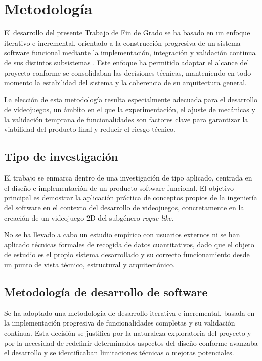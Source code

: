\chapter{Metodología}

El desarrollo del presente Trabajo de Fin de Grado se ha basado en un enfoque iterativo e incremental, orientado a la construcción progresiva de un sistema software funcional mediante la implementación, integración y validación continua de sus distintos subsistemas \cite{REF_METODOLOGIA}. Este enfoque ha permitido adaptar el alcance del proyecto conforme se consolidaban las decisiones técnicas, manteniendo en todo momento la estabilidad del sistema y la coherencia de su arquitectura general.

La elección de esta metodología resulta especialmente adecuada para el desarrollo de videojuegos, un ámbito en el que la experimentación, el ajuste de mecánicas y la validación temprana de funcionalidades son factores clave para garantizar la viabilidad del producto final y reducir el riesgo técnico.

\section{Tipo de investigación}

El trabajo se enmarca dentro de una investigación de tipo aplicado, centrada en el diseño e implementación de un producto software funcional. El objetivo principal es demostrar la aplicación práctica de conceptos propios de la ingeniería del software en el contexto del desarrollo de videojuegos, concretamente en la creación de un videojuego 2D del subgénero \textit{rogue-like}.

No se ha llevado a cabo un estudio empírico con usuarios externos ni se han aplicado técnicas formales de recogida de datos cuantitativos, dado que el objeto de estudio es el propio sistema desarrollado y su correcto funcionamiento desde un punto de vista técnico, estructural y arquitectónico.

\section{Metodología de desarrollo de software}

Se ha adoptado una metodología de desarrollo iterativa e incremental, basada en la implementación progresiva de funcionalidades completas y su validación continua. Esta decisión se justifica por la naturaleza exploratoria del proyecto y por la necesidad de redefinir determinados aspectos del diseño conforme avanzaba el desarrollo y se identificaban limitaciones técnicas o mejoras potenciales.

